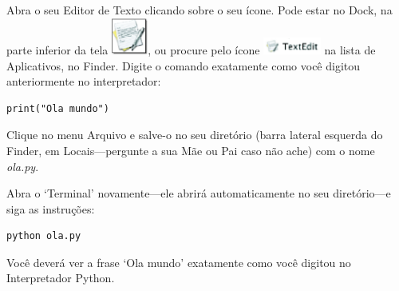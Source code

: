 \begin{MAC}
Abra o seu Editor de Texto clicando sobre o seu ícone. Pode estar no Dock, na parte inferior da tela \includegraphics*[width=12mm]{eps/textedit-icon.eps}, ou procure pelo ícone \includegraphics*[width=19mm]{eps/textedit-icon2.eps} na lista de Aplicativos, no Finder. Digite o comando  exatamente como você digitou anteriormente no interpretador:

\begin{listing}
\begin{verbatim}
print("Ola mundo")
\end{verbatim}
\end{listing}

Clique no menu Arquivo e salve-o no seu diretório (barra lateral esquerda do Finder, em Locais---pergunte a sua Mãe ou Pai caso não ache) com o nome \emph{ola.py}.

Abra o `Terminal' novamente---ele abrirá automaticamente no seu diretório---e siga as instruções:

\begin{listing}
\begin{verbatim}
python ola.py
\end{verbatim}
\end{listing}

Você deverá ver a frase `Ola mundo' exatamente como você digitou no Interpretador Python.

\end{MAC}

